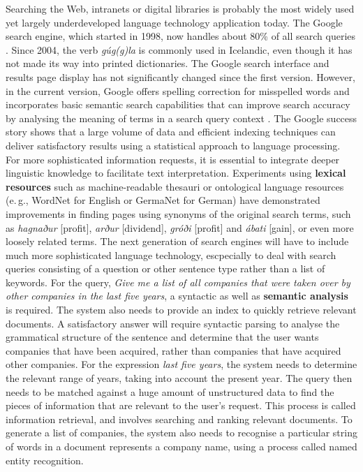 \documentclass{../../metanetpaper}
\begin{document}
\begin{multicols}{2}
Searching the Web, intranets or digital libraries is probably the most widely used yet largely underdeveloped language technology application today. The Google search engine, which started in 1998, now handles about 80\% of all search queries \cite{spi1}. Since 2004, the verb \textit{gúg(g)la} is commonly used in Icelandic, even though it has not made its way into printed dictionaries.  The Google search interface and results page display has not significantly changed since the first version. However, in the current version, Google offers spelling correction for misspelled words and incorporates basic semantic search capabilities that can improve search accuracy by analysing the meaning of terms in a search query context \cite{pc1}. The Google success story shows that a large volume of data and efficient indexing techniques can deliver satisfactory results using a statistical approach to language processing. 
For more sophisticated information requests, it is essential to integrate deeper linguistic knowledge to facilitate text interpretation. Experiments using \textbf{lexical resources} such as machine-readable thesauri or ontological language resources (e.\,g., WordNet for English or GermaNet for German) have demonstrated improvements in finding pages using synonyms of the original search terms, such as \textit{hagnaður} {[}profit{]}, \textit{arður} {[}dividend{]}, \textit{gróði} {[}profit{]} and \textit{ábati} {[}gain{]}, or even more loosely related terms.
The next generation of search engines will have to include much more sophisticated language technology, escpecially to deal with search queries consisting of a question or other sentence type rather than a list of keywords. For the query, \textit{Give me a list of all companies that were taken over by other companies in the last five years}, a syntactic as well as \textbf{semantic analysis} is required. The system also needs to provide an index to quickly retrieve relevant documents. A satisfactory answer will require syntactic parsing to analyse the grammatical structure of the sentence and determine that the user wants companies that have been acquired, rather than companies that have acquired other companies. For the expression \textit{last five years}, the system needs to determine the relevant range of years, taking into account the present year. The query then needs to be matched against a huge amount of unstructured data to find the pieces of information that are relevant to the user’s request. This process is called information retrieval, and involves searching and ranking relevant documents. To generate a list of companies, the system also needs to recognise a particular string of words in a document represents a company name, using a process called named entity recognition.


\end{multicols}
\end{document}
